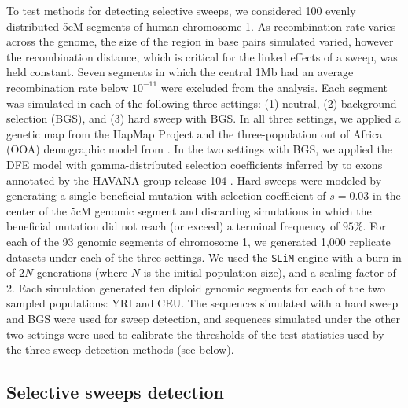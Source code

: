 \documentclass[hidelinks]{article}
\newcommand{\stdpopsim}{\texttt{stdpopsim}\xspace}
\newcommand{\slim}{\texttt{SLiM}\xspace}
\begin{document}
    To test methods for detecting selective sweeps, we considered 100 evenly distributed 5cM
    segments of human chromosome 1.
    As recombination rate varies across the genome, the size of the region in base pairs simulated varied, however the recombination distance,
    which is critical for the linked effects of a sweep, was held constant.
    Seven segments in which the central 1Mb had an average recombination rate below $10^{-11}$ were excluded from the analysis.
    Each segment was simulated in each of the following three settings:
    (1) neutral, (2) background selection (BGS), and (3) hard sweep with BGS.
    In all three settings, we applied a genetic map from the HapMap Project
    \citep[\stdpopsim label \texttt{HapMapII\_GRCh38}]{international2007second} and
    the three-population out of Africa (OOA) demographic model from
    \citet[\stdpopsim label \texttt{OutOfAfrica\_3G09}]{gutenkunst2009inferring}.
    In the two settings with BGS, we applied the DFE model with gamma-distributed selection coefficients inferred by
    \citet[\stdpopsim label \texttt{Gamma\_K17}]{kim2017inference} to exons annotated by the HAVANA group release 104
    \citep[\stdpopsim label \texttt{ensembl\_havana\_104\_exons}]{ensembl2018}.
    Hard sweeps were modeled by generating a single beneficial mutation
    with selection coefficient of $s = 0.03$ in the center of the 5cM genomic segment
    and discarding simulations in which the beneficial mutation did not reach (or exceed) a terminal frequency of $95\%$.
    For each of the 93 genomic segments of chromosome 1, we generated 1,000 replicate datasets under each of the three settings.
    We used the \slim engine with a burn-in of $2N$ generations
    (where $N$ is the initial population size), and a scaling factor of 2.
    Each simulation generated ten diploid genomic segments for each of the two sampled populations: YRI and CEU.
    The sequences simulated with a hard sweep and BGS were used for sweep detection,
    and sequences simulated under the other two settings were used to calibrate the thresholds of the test statistics
    used by the three sweep-detection methods (see below).

    \subsection*{Selective sweeps detection}
\end{document}
